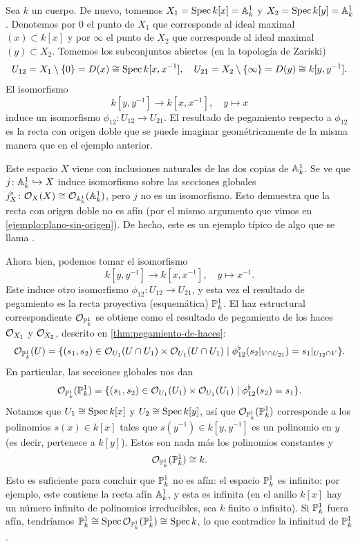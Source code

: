 \documentclass{article}
\numberwithin{equation}{section}
\theoremstyle{definition}
\begin{document}
\begin{ejemplo}
  Sea $k$ un cuerpo. De nuevo, tomemos $X_1 = \Spec k [x] = \AA^1_k$ y
  $X_2 = \Spec k [y] = \AA^1_k$. Denotemos por $0$ el punto de $X_1$
  que corresponde al ideal maximal $(x) \subset k [x]$ y por $\infty$ el punto
  de $X_2$ que corresponde al ideal maximal $(y) \subset X_2$.
  Tomemos los subconjuntos abiertos (en la topología de Zariski)
  \[ U_{12} = X_1 \setminus \{ 0 \} = D (x) \isom \Spec k [x,x^{-1}], \quad
     U_{21} = X_2 \setminus \{ \infty \} = D (y) \isom k [y,y^{-1}]. \]
  El isomorfismo
  $$k [y,y^{-1}] \to k [x,x^{-1}], \quad y \mapsto x$$
  induce un isomorfismo $\phi_{12}\colon U_{12} \to U_{21}$. El resultado
  de pegamiento respecto a $\phi_{12}$ es la recta con origen doble que se puede
  imaginar geométricamente de la misma manera que en el ejemplo anterior.

  Este espacio $X$ viene con inclusiones naturales de las dos copias
  de $\AA^1_k$. Se ve que $j\colon \AA^1_k \hookrightarrow X$ induce isomorfismo
  sobre las secciones globales
  $j^\flat_X\colon \O_X (X) \isom \O_{\AA^1_k} (\AA^1_k)$, pero $j$ no es
  un isomorfismo. Esto demuestra que la recta con origen doble no es afín
  (por el mismo argumento que vimos en \ref{ejemplo:plano-sin-origen}).
  De hecho, este es un ejemplo típico de algo que se llama
  .

  \vspace{1em}

  Ahora bien, podemos tomar el isomorfismo
  $$k [y,y^{-1}] \to k [x,x^{-1}], \quad y \mapsto x^{-1}.$$
  Este induce otro isomorfismo $\phi_{12}\colon U_{12} \to U_{21}$, y esta vez
  el resultado de pegamiento es la recta proyectiva (esquemática) $\PP^1_k$.
  El haz estructural correspondiente $\O_{\PP^1_k}$ se obtiene como el resultado
  de pegamiento de los haces $\O_{X_1}$ y $\O_{X_2}$, descrito en
  \ref{thm:pegamiento-de-haces}:
  \[ \O_{\PP^1_k} (U) =
     \{ (s_1,s_2) \in \O_{U_1} (U\cap U_1) \times \O_{U_1} (U\cap U_1) \mid
        \phi_{12}^\flat (s_2|_{V\cap U_{21}}) = s_1|_{U_{12} \cap V} \}. \]
  En particular, las secciones globales nos dan
  \[ \O_{\PP^1_k} (\PP^1_k) =
     \{ (s_1,s_2) \in \O_{U_1} (U_1) \times \O_{U_1} (U_1) \mid
        \phi_{12}^\flat (s_2) = s_1 \}. \]
  Notamos que $U_1 \isom \Spec k[x]$ y $U_2 \isom \Spec k [y]$, así que
  $\O_{\PP^1_k} (\PP^1_k)$ corresponde a los polinomios $s (x) \in k [x]$ tales
  que $s (y^{-1}) \in k [y,y^{-1}]$ es un polinomio en $y$ (es decir, pertenece
  a $k [y]$). Estos son nada más los polinomios constantes y
  $$\O_{\PP^1_k} (\PP^1_k) \isom k.$$
  Esto es suficiente para concluir que $\PP^1_k$ no es afín: el espacio
  $\PP^1_k$ es infinito: por ejemplo, este contiene la recta afín $\AA^1_k$,
  y esta es infinita (en el anillo $k [x]$ hay un número infinito de polinomios
  irreducibles, sea $k$ finito o infinito). Si $\PP^1_k$ fuera afín, tendríamos
  $\PP^1_k \isom \Spec \O_{\PP^1_k} (\PP^1_k) \isom \Spec k$, lo que contradice
  la infinitud de $\PP^1_k$.


\end{ejemplo}
\end{document}
